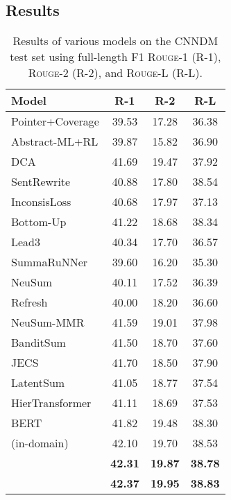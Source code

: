\documentclass[11pt,a4paper]{article}
\begin{document}
\subsection{Results}

\begin{table}[t]
	\centering
\begin{tabular}[t]{|@{~}l @{~}|@{~}c c c@{~}|}
		\hline
		Model & R-1 & R-2 & R-L \\
		\hline
		\hline
{Pointer+Coverage} & 39.53 & 17.28 & 36.38 \\
		{Abstract-ML+RL} & 39.87 & 15.82 & 36.90 \\ 
		DCA & 41.69 & 19.47 & 37.92 \\
		SentRewrite & 40.88 &  17.80 & 38.54 \\
		InconsisLoss & 40.68 & 17.97 & 37.13 \\
		Bottom-Up & 41.22 & 18.68 & 38.34 \\
		\hline\hline
		{Lead3} & 40.34 & 17.70 & 36.57 \\
		{SummaRuNNer} & 39.60 & 16.20 & 35.30 \\
		NeuSum & 40.11 & 17.52 & 36.39 \\
		{Refresh} & 40.00 & 18.20 & 36.60 \\
		NeuSum-MMR & 41.59 & 19.01 & 37.98 \\
		BanditSum & 41.50 & 18.70 & 37.60 \\
		JECS & 41.70 & 18.50 & 37.90 \\
		{LatentSum} & 41.05 & {18.77} & 37.54 \\
		HierTransformer & 41.11 & 18.69 & 37.53 \\
		BERT & 41.82 & 19.48 & 38.30 \\
		 (in-domain) & 42.10 & 19.70 & 38.53 \\
		 & {\bf 42.31} & {\bf 19.87} & {\bf 38.78} \\
		 & {\bf 42.37} & {\bf 19.95} & {\bf 38.83} \\
		\hline
	\end{tabular}
	\caption{Results of various models on the CNNDM test
		set using full-length F1 \mbox{\textsc{Rouge-1}} (R-1),
		\textsc{Rouge-2} (R-2), and \textsc{Rouge-L} (R-L).}
	\label{tbl:cnndaily}
\end{table}
\end{document}
